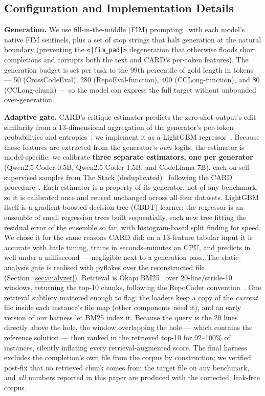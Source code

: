 \documentclass[10pt,conference]{IEEEtran}
\newcommand{\ugr}[1]{{\color{revgreen}#1}}
\begin{document}
\subsection{Configuration and Implementation Details}
\label{sec:config}
\textbf{Generation.} We use fill-in-the-middle (FIM)
prompting~\cite{bavarian2022fim} with each model's native FIM sentinels, plus a set
of stop strings that halt generation at the natural boundary (preventing the
\texttt{<|fim\_pad|>} degeneration that otherwise floods short completions and
corrupts both the text and CARD's per-token features). The generation budget is set
per task to the 99th percentile of gold length in tokens --- 50 (CrossCodeEval),
280 (RepoEval-function), 400 (CCLong-function), and 80 (CCLong-chunk) --- so the
model can express the full target without unbounded over-generation.

\textbf{Adaptive gate.} CARD's critique estimator predicts the zero-shot output's
edit similarity from a 13-dimensional aggregation of the generator's per-token
probabilities and entropies~\cite{zhang2024card}; we implement it as a LightGBM
regressor~\cite{ke2017lightgbm}. Because those features are extracted from the
generator's \emph{own} logits, the estimator is model-specific: we calibrate
\textbf{three separate estimators, one per generator} (Qwen2.5-Coder-0.5B,
Qwen2.5-Coder-1.5B, and CodeLlama-7B), each on self-supervised samples from The
Stack (deduplicated)~\cite{kocetkov2022stack} following the CARD
procedure~\cite{zhang2024card}. Each estimator is a property of its generator,
not of any benchmark, so it is calibrated once and reused unchanged across all
four datasets. \ugr{LightGBM itself is a gradient-boosted decision-tree (GBDT)
learner: the regressor is an ensemble of small regression trees built
sequentially, each new tree fitting the residual error of the ensemble so far,
with histogram-based split finding for speed. We chose it for the same reasons
CARD did: on a 13-feature tabular input it is accurate with little tuning,
trains in seconds--minutes on CPU, and predicts in well under a millisecond ---
negligible next to a generation pass.} The
static-analysis gate is realised with pyflakes over the reconstructed file
(Section~\ref{sec:analyzer}). Retrieval
is Okapi BM25~\cite{robertson2009bm25} over 20-line/stride-10 windows, returning the
top-10 chunks, following the RepoCoder convention~\cite{zhang2023repocoder}.
\ugr{One retrieval subtlety mattered enough to flag: the loaders keep a copy of
the \emph{current} file inside each instance's file map (other components need
it), and an early version of our harness let BM25 index it. Because the query is
the 20 lines directly above the hole, the window overlapping the hole --- which
contains the reference solution --- then ranked in the retrieved top-10 for
92--100\% of instances, silently inflating every retrieval-augmented score. The
final harness excludes the completion's own file from the corpus by
construction; we verified post-fix that no retrieved chunk comes from the
target file on any benchmark, and \emph{all} numbers reported in this paper are
produced with the corrected, leak-free corpus.}
\end{document}
